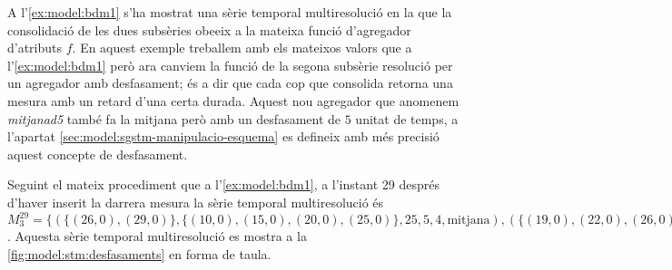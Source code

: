 \begin{example} 
\label{ex:model:bdm-desfasaments}

A l'\autoref{ex:model:bdm1} s'ha mostrat una sèrie temporal
multiresolució en la que la consolidació de les dues subsèries obeeix
a la mateixa funció d'agregador d'atributs $f$. En aquest exemple
treballem amb els mateixos valors que a l'\autoref{ex:model:bdm1} però
ara canviem la funció de la segona subsèrie resolució per un agregador
amb desfasament; és a dir que cada cop que consolida retorna una
mesura amb un retard d'una certa durada. Aquest nou agregador que
anomenem \emph{mitjanad5} també fa la mitjana però amb un desfasament
de $5$ unitat de temps, a l'apartat
\ref{sec:model:sgstm-manipulacio-esquema} es defineix amb més precisió
aquest concepte de desfasament.


Seguint el mateix procediment que a l'\autoref{ex:model:bdm1}, a
l'instant 29 després d'haver inserit la darrera mesura la sèrie
temporal multiresolució és $M_3^{29} = \{ ( \{(26,0),(29,0)\} ,
\{(10,0),(15,0),(20,0),(25,0)\} , 25 , 5 ,4 , \text{mitjana} ) , (
\{(19,0),(22,0),(26,0),(29,0)\} , \{(5,0),(15,0)\} , 20 , 10 ,3 ,
\text{mitjanad5} ) \}$.  Aquesta sèrie temporal multiresolució es
mostra a la \autoref{fig:model:stm:desfasaments} en forma de taula.



\end{example}
